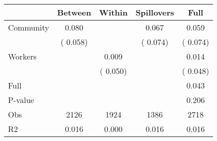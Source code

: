 
\begin{tabular}{l*{4}{c}}\hline&\multicolumn{1}{c}{Between}&\multicolumn{1}{c}{Within}&\multicolumn{1}{c}{Spillovers}&\multicolumn{1}{c}{Full}\\ \hline
 Community             &              0.080      &                                               &        0.067 &         0.059                            \\ 
                               &        (       0.058)           &                                       &       (       0.074)     &      (       0.074)                                           \\ 
 Workers       &                                               &        0.009    &                                &             0.014                            \\ 
                               &                                               & (       0.050)                  &                                        &      (       0.048)                                           \\ 
\hline                                                                                                                                                                                                                                            
 Full                  &                                               &                                               &                                        &             0.043                                     \\ 
 P-value               &                                               &                                               &                                        &             0.206                                           \\ 
 Obs                   &               2126               &       1924                       &       1386                &              2718                                               \\ 
 R2                    &                      0.016              &              0.000                      &              0.016               &                     0.016                                              \\ 
\hline \end{tabular}                                                                                                                                                                                                              